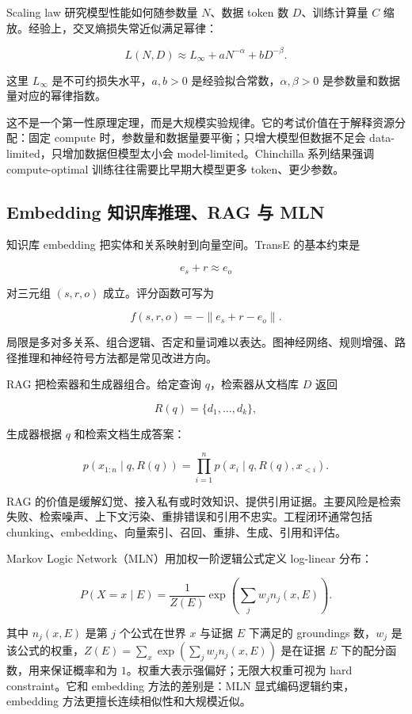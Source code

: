 
Scaling law 研究模型性能如何随参数量 \(N\)、数据 token 数 \(D\)、训练计算量 \(C\) 缩放。经验上，交叉熵损失常近似满足幂律：

\[
  L(N,D)
  \approx
  L_\infty
  +
  aN^{-\alpha}
  +
  bD^{-\beta}.
\]

这里 \(L_\infty\) 是不可约损失水平，\(a,b>0\) 是经验拟合常数，\(\alpha,\beta>0\) 是参数量和数据量对应的幂律指数。

这不是一个第一性原理定理，而是大规模实验规律。它的考试价值在于解释资源分配：固定 compute 时，参数量和数据量要平衡；只增大模型但数据不足会 data-limited，只增加数据但模型太小会 model-limited。Chinchilla 系列结果强调 compute-optimal 训练往往需要比早期大模型更多 token、更少参数。

\subsection{Embedding 知识库推理、RAG 与 MLN}


知识库 embedding 把实体和关系映射到向量空间。TransE 的基本约束是

\[
  e_s+r\approx e_o
\]

对三元组 \((s,r,o)\) 成立。评分函数可写为

\[
  f(s,r,o)=-\|e_s+r-e_o\|.
\]

局限是多对多关系、组合逻辑、否定和量词难以表达。图神经网络、规则增强、路径推理和神经符号方法都是常见改进方向。

RAG 把检索器和生成器组合。给定查询 \(q\)，检索器从文档库 \(D\) 返回

\[
  R(q)=\{d_1,\ldots,d_k\},
\]

生成器根据 \(q\) 和检索文档生成答案：

\[
  p(x_{1:n}\mid q,R(q))
  =
  \prod_{i=1}^{n}
  p(x_i\mid q,R(q),x_{<i}).
\]

RAG 的价值是缓解幻觉、接入私有或时效知识、提供引用证据。主要风险是检索失败、检索噪声、上下文污染、重排错误和引用不忠实。工程闭环通常包括 chunking、embedding、向量索引、召回、重排、生成、引用和评估。

Markov Logic Network（MLN）用加权一阶逻辑公式定义 log-linear 分布：

\[
  P(X=x\mid E)
  =
  \frac{1}{Z(E)}
  \exp
  \left(
    \sum_j w_j n_j(x,E)
  \right).
\]

其中 \(n_j(x,E)\) 是第 \(j\) 个公式在世界 \(x\) 与证据 \(E\) 下满足的 groundings 数，\(w_j\) 是该公式的权重，\(Z(E)=\sum_x \exp(\sum_j w_j n_j(x,E))\) 是在证据 \(E\) 下的配分函数，用来保证概率和为 \(1\)。权重大表示强偏好；无限大权重可视为 hard constraint。它和 embedding 方法的差别是：MLN 显式编码逻辑约束，embedding 方法更擅长连续相似性和大规模近似。

